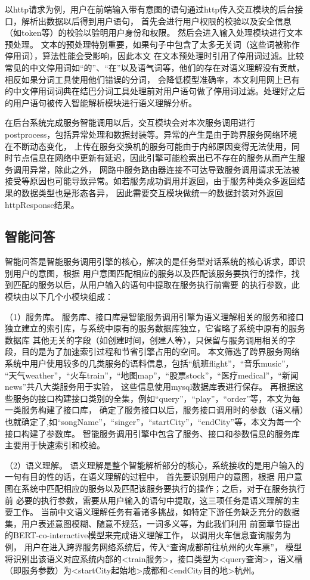以http请求为例，用户在前端输入带有意图的语句通过http传入交互模块的后台接口，解析出数据以后得到用户语句，
首先会进行用户权限的校验以及安全信息（如token等）的校验以验明用户身份和权限。
然后会进入输入处理模块进行文本预处理。
文本的预处理特别重要，如果句子中包含了太多无关词（这些词被称作停用词），算法性能会受影响，因此本文
在文本预处理时引用了停用词过滤。比较常见的中文停用词如“的”、“在”以及语气词等，他们的存在对语义理解没有贡献，相反如果分词工具使用他们错误的分词，
会降低模型准确率，本文利用网上已有的中文停用词词典在结巴分词工具处理前对用户语句做了停用词过滤。处理好之后的用户语句被传入智能解析模块进行语义理解分析。

在后台系统完成服务智能调用以后，交互模块会对本次服务调用进行postprocess，包括异常处理和数据封装等。异常的产生是由于跨界服务网络环境在不断动态变化，
上传在服务交换机的服务可能由于内部原因变得无法使用，同时节点信息在网络中更新有延迟，因此引擎可能检索出已不存在的服务从而产生服务调用异常，除此之外，
网路中服务路由器连接不可达导致服务调用请求无法被接受等原因也可能导致异常。如若服务成功调用并返回，由于服务种类众多返回结果的数据类型也是形态各异，
因此需要交互模块做统一的数据封装对外返回httpResponse结果。

\subsection{智能问答}
智能问答是智能服务调用引擎的核心，解决的是任务型对话系统的核心诉求，即识别用户的意图，根据
用户意图匹配相应的服务以及匹配该服务要执行的操作，找到匹配的服务以后，从用户输入的语句中提取在服务执行前需要
的执行参数，此模块由以下几个小模块组成：

（1）服务库。
服务库、接口库是智能服务调用引擎为语义理解相关的服务和接口独立建立的索引库，与系统中原有的服务数据库独立，它省略了系统中原有的服务数据库
其他无关的字段（如创建时间，创建人等），只保留与服务调用相关的字段，目的是为了加速索引过程和节省引擎占用的空间。
本文筛选了跨界服务网络系统中用户使用较多的几类服务的语料信息，包括“航班flight”，“音乐music”，
“天气weather”，“火车train”，“地图map”，“股票stock”，“医疗medical”，“新闻news”共八大类服务用于实验，
这些信息使用mysql数据库表进行保存。
再根据这些服务的接口构建接口类别的全集，例如“query”，“play”，“order”等，本文为每一类服务构建了接口库，
确定了服务接口以后，服务接口调用时的参数（语义槽）也就确定了,如“songName”，“singer”，“startCity”，“endCity”等，本文为每一个接口构建了参数库。
智能服务调用引擎中包含了服务、接口和参数信息的服务库主要用于快速索引和校验。

（2）语义理解。 
语义理解是整个智能解析部分的核心，系统接收的是用户输入的一句有目的性的话，在语义理解的过程中，
首先要识别用户的意图，根据
用户意图在系统中匹配相应的服务以及匹配该服务要执行的操作；之后，对于在服务执行前
必要的执行参数，需要从用户输入的语句中提取，这三项任务是语义理解的主要工作。
当前中文语义理解任务有着诸多挑战，如特定下游任务缺乏充分的数据集，用户表述意图模糊、随意不规范，一词多义等，为此我们利用
前面章节提出的BERT-co-interactive模型来完成语义理解工作，
以调用火车信息查询服务为例，
用户在进入跨界服务网络系统后，传入“查询成都前往杭州的火车票”，
模型将识别出该语义对应系统内部的<train服务>，接口类型为<query查询>，语义槽（即服务参数）为<startCity起始地>成都和<endCity目的地>杭州。

